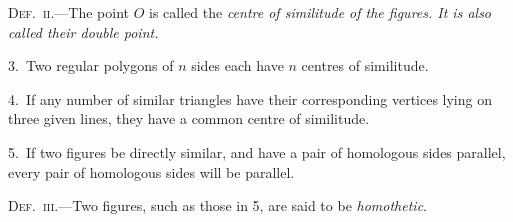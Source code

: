 \documentclass[oneside]{book}
\begin{document}
\textsc{Def.~ii.}---The point $O$ is called the \emph{centre of similitude
of the figures. It is also called their double point.}

\smallskip
\begin{footnotesize}
3.~Two regular polygons of $n$ sides each have $n$ centres of
similitude.

4.~If any number of similar triangles have their corresponding
vertices lying on three given lines, they have a common centre of
similitude.

5.~If two figures be directly similar, and have a pair of homologous
sides parallel, every pair of homologous sides will be
parallel.
\par\end{footnotesize}

\textsc{Def.~iii.}---Two figures, such as those in 5, are said
to be \emph{homothetic}.
\end{document}
